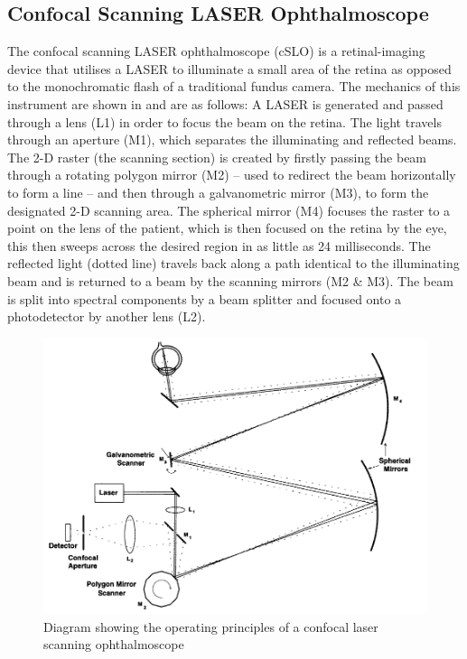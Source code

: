 \subsection{Confocal Scanning LASER Ophthalmoscope}

The confocal scanning LASER ophthalmoscope (cSLO) is a retinal-imaging device
that utilises a LASER to illuminate a small area of the retina as opposed to
the monochromatic flash of a traditional fundus camera. The mechanics of this
instrument are shown in  and are as follows: A LASER is generated
and passed through a lens (L1) in order to focus the beam on the retina. The
light travels through an aperture (M1), which separates the illuminating and
reflected beams. The 2-D raster (the scanning section) is created by firstly
passing the beam through a rotating polygon mirror (M2) – used to redirect
the beam horizontally to form a line – and then through a galvanometric
mirror (M3), to form the designated 2-D scanning area. The spherical mirror
(M4) focuses the raster to a point on the lens of the patient, which is then
focused on the retina by the eye, this then sweeps across the desired region
in as little as 24 milliseconds. The reflected light (dotted line) travels
back along a path identical to the illuminating beam and is returned to a
beam by the scanning mirrors (M2 \& M3). The beam is split into spectral
components by a beam splitter and focused onto a photodetector by another
lens (L2).\cite{webb1987confocal}

\begin{figure}[htbp]
\centering
\includegraphics{figures/cslo}
\caption{Diagram showing the operating principles of a confocal laser scanning ophthalmoscope}
\label{fig:cslo}
\end{figure}


